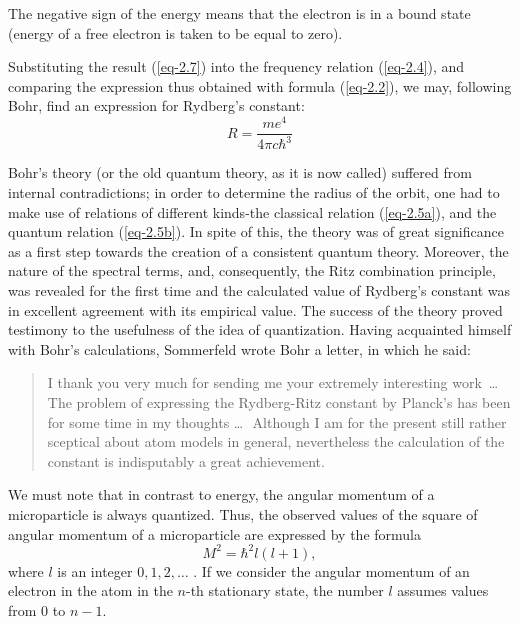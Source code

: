 \documentclass[a4paper,sfsidenotes,colorlinks=true]{tufte-book}
\numberwithin{equation}{section}
\numberwithin{figure}{section}
\begin{document}
The negative sign of the energy means that the electron is in a bound
state (energy of a free electron is taken to be equal to zero).

Substituting the result (\ref{eq-2.7}) into the frequency
relation (\ref{eq-2.4}), and comparing the expression thus obtained with
formula (\ref{eq-2.2}), we may, following Bohr, find an expression for
Rydberg's constant: 
\begin{equation}%
 R = \frac{me^{4}}{4 \pi c \hbar^{3}}
\label{eq-2.8} 
\end{equation}

Bohr's theory (or the old quantum theory, as it is now called)
 suffered from internal contradictions; in order to determine the
 radius of the orbit, one had to make use of relations of different
 kinds-the classical relation (\ref{eq-2.5a}), and the quantum relation
 (\ref{eq-2.5b}). In spite of this, the theory was of great significance as a
 first step towards the creation of a consistent quantum
 theory. Moreover, the nature of the spectral terms, and,
 consequently, the Ritz combination principle, was revealed for the
 first time and the calculated value of Rydberg's constant was in
 excellent agreement with its empirical value. The success of the
 theory proved testimony to the usefulness of the idea of
 quantization. Having acquainted himself with Bohr's calculations,
 Sommerfeld wrote Bohr a letter, in which he said: 

\begin{quote} 
I thank you very much for sending me your extremely interesting
work~\ldots \,\, The problem of expressing the Rydberg-Ritz constant by
Planck's has been for some time in my thoughts \ldots \,\, Although I am
for the present still rather sceptical about atom models in general,
nevertheless the calculation of the constant is indisputably a great achievement.
\end{quote}

We must note that in contrast to energy, the angular momentum of a
microparticle is always quantized. Thus, the observed values of the
square of angular momentum of a microparticle are expressed by the
formula
\begin{equation}%
 M^{2}= \hbar^{2} l (l+1), 
\tag{2.9a}
\label{eq-2.9a} 
\end{equation}
where $l$ is an integer $0, 1, 2, \ldots$ . If we consider the angular momentum of an
electron in the atom in the $n$-th stationary state, the number $l$
assumes values from 0 to $n-1$.  
\end{document}
